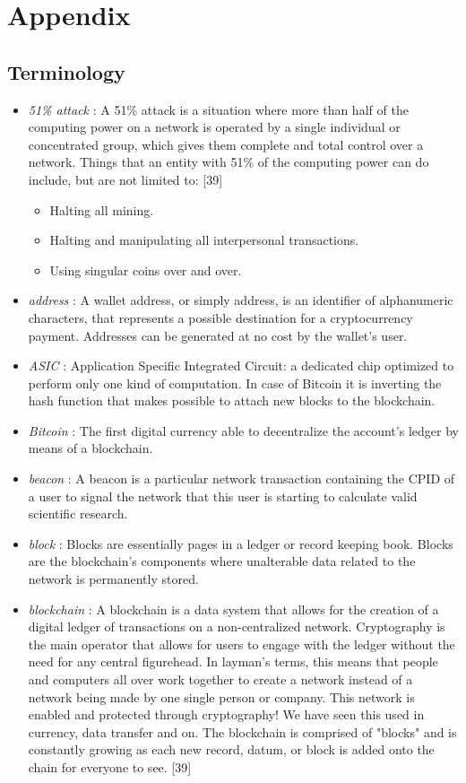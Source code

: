 \section{Appendix}

\subsection{Terminology}

\begin{itemize}
  \item \textit{51\% attack} : A 51\% attack is a situation where more than half of the computing power on a network is operated by a single individual or concentrated group, which   gives them complete and total control over a network. Things that an entity with 51\% of the computing power can do include, but are not limited to: [39]\\
  \begin{itemize}
	\item Halting all mining.
	\item Halting and manipulating all interpersonal transactions.
	\item Using singular coins over and over.
  \end{itemize}
  \item \textit{address} : A wallet address, or simply address, is an identifier of alphanumeric characters, that represents a possible destination for a cryptocurrency payment. Addresses can be generated at no cost by the wallet's user. 
  \item \textit{ASIC} : Application Specific Integrated Circuit: a dedicated chip optimized to perform only one kind of computation. In case of Bitcoin it is inverting the hash function that makes possible to attach new blocks to the blockchain.
  \item \textit{Bitcoin} : The first digital currency able to decentralize the account's ledger by means of a blockchain. 
  \item \textit{beacon} : A beacon is a particular network transaction containing the CPID of a user to signal the network that this user is starting to calculate valid scientific research.
  \item \textit{block} : Blocks are essentially pages in a ledger or record keeping book. Blocks are the blockchain's components where unalterable data related to the network is permanently stored. 
  \item \textit{blockchain} : A blockchain is a data system that allows for the creation of a digital ledger of transactions on a non-centralized network. Cryptography is the main operator that allows for users to engage with the ledger without the need for any central figurehead. In layman’s terms, this means that people and computers all over work together to create a network instead of a network being made by one single person or company. This network is enabled and protected through cryptography! We have seen this used in currency, data transfer and on. The blockchain is comprised of "blocks" and is constantly growing as each new record, datum, or block is added onto the chain for everyone to see. [39]

\end{itemize}
